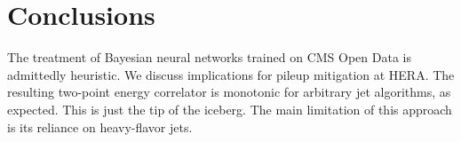 \section{Conclusions}\label{sec:conclusions}

The treatment of Bayesian neural networks trained on CMS Open Data is
admittedly heuristic. We discuss implications for pileup mitigation at
HERA. The resulting two-point energy correlator is monotonic for
arbitrary jet algorithms, as expected. This is just the tip of the
iceberg. The main limitation of this approach is its reliance on
heavy-flavor jets.

